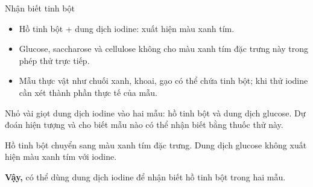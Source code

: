 \begin{ghinho}{Nhận biết tinh bột}
\begin{itemize}
\item Hồ tinh bột + dung dịch iodine: xuất hiện màu xanh tím.
\item Glucose, saccharose và cellulose không cho màu xanh tím đặc trưng này trong phép thử trực tiếp.
\item Mẫu thực vật như chuối xanh, khoai, gạo có thể chứa tinh bột; khi thử iodine cần xét thành phần thực tế của mẫu.
\end{itemize}
\end{ghinho}

\begin{vidu}
Nhỏ vài giọt dung dịch iodine vào hai mẫu: hồ tinh bột và dung dịch glucose. Dự đoán hiện tượng và cho biết mẫu nào có thể nhận biết bằng thuốc thử này.
\end{vidu}
\begin{loigiai}
Hồ tinh bột chuyển sang màu xanh tím đặc trưng. Dung dịch glucose không xuất hiện màu xanh tím với iodine.

\textbf{Vậy,} có thể dùng dung dịch iodine để nhận biết hồ tinh bột trong hai mẫu.
\end{loigiai}
